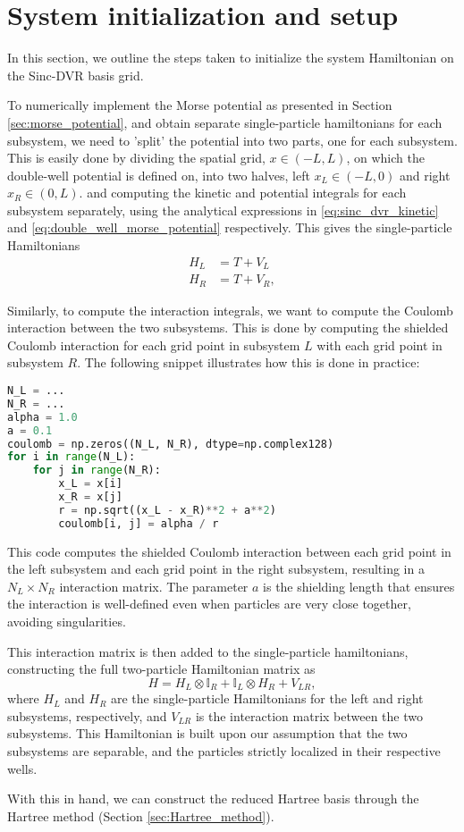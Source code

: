 \documentclass{subfiles}
\begin{document}
\section{System initialization and setup}\label{sec:system_init}
In this section, we outline the steps taken to initialize the system Hamiltonian on the Sinc-DVR basis grid.

To numerically implement the Morse potential as presented in Section \ref{sec:morse_potential}, and obtain separate single-particle hamiltonians for each subsystem, we need to 'split' the potential into two parts, one for each subsystem. This is easily done by dividing the spatial grid, $x\in(-L, L)$, on which the double-well potential is defined on, into two halves, left $x_L\in(-L, 0)$ and right $x_R\in(0, L)$. and computing the kinetic and potential integrals for each subsystem separately, using the analytical expressions in \eqref{eq:sinc_dvr_kinetic} and \eqref{eq:double_well_morse_potential} respectively. This gives the single-particle Hamiltonians 
\begin{align*}
    H_L &= T + V_L \\
    H_R &= T + V_R,
\end{align*}

Similarly, to compute the interaction integrals, we want to compute the Coulomb interaction between the two subsystems. This is done by computing the shielded Coulomb interaction for each grid point in subsystem $L$ with each grid point in subsystem $R$. The following snippet illustrates how this is done in practice:
\begin{lstlisting}[language=Python]
N_L = ...
N_R = ...
alpha = 1.0
a = 0.1
coulomb = np.zeros((N_L, N_R), dtype=np.complex128)
for i in range(N_L):
    for j in range(N_R):
        x_L = x[i]
        x_R = x[j]
        r = np.sqrt((x_L - x_R)**2 + a**2)
        coulomb[i, j] = alpha / r
\end{lstlisting}
This code computes the shielded Coulomb interaction between each grid point in the left subsystem and each grid point in the right subsystem, resulting in a $N_L \times N_R$ interaction matrix. The parameter $a$ is the shielding length that ensures the interaction is well-defined even when particles are very close together, avoiding singularities.

This interaction matrix is then added to the single-particle hamiltonians, constructing the full two-particle Hamiltonian matrix as
\begin{equation}
    H = H_L \otimes \mathbb{I}_R + \mathbb{I}_L \otimes H_R + V_{LR},\label{eq:two_particle_hamiltonian}
\end{equation}
where $H_L$ and $H_R$ are the single-particle Hamiltonians for the left and right subsystems, respectively, and $V_{LR}$ is the interaction matrix between the two subsystems. This Hamiltonian is built upon our assumption that the two subsystems are separable, and the particles strictly localized in their respective wells.

With this in hand, we can construct the reduced Hartree basis through the Hartree method (Section \ref{sec:Hartree_method}).
\end{document}
